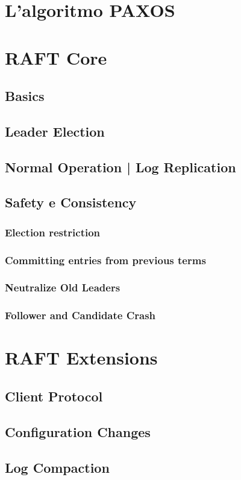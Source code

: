 	\section{L'algoritmo PAXOS}
	\section{RAFT Core}
		\subsection{Basics}
		\subsection{Leader Election}
		\subsection{Normal Operation | Log Replication}
		\subsection{Safety e Consistency}
			\subsubsection{Election restriction}
			\subsubsection{Committing entries from previous terms}
			\subsubsection{Neutralize Old Leaders}
			\subsubsection{Follower and Candidate Crash}
	\section{RAFT Extensions}
		\subsection{Client Protocol}
		\subsection{Configuration Changes}
		\subsection{Log Compaction}